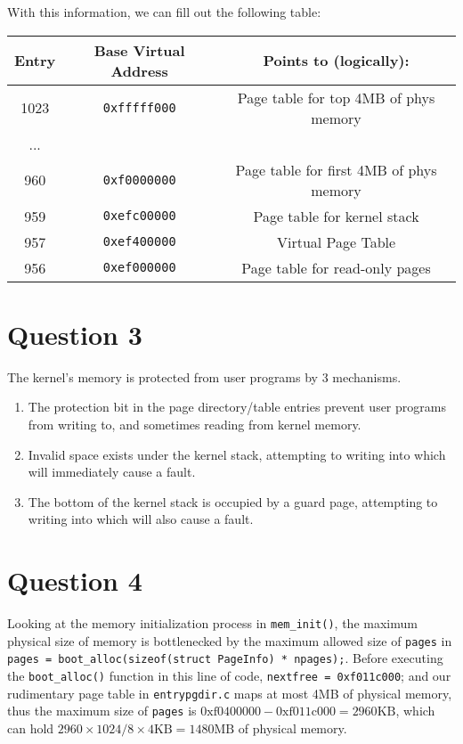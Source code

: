 \documentclass[]{article}
\begin{document}
With this information, we can fill out the  following table:

\begin{center}
	\begin{tabular}{|c|c|c|}
		\hline
		Entry & Base Virtual Address & Points to (logically): \\
		\hline
		1023 & \verb|0xfffff000| & Page table for top 4MB of phys memory\\
		\hline
		... & & \\
		\hline
		960 & \verb|0xf0000000| & Page table for first 4MB of phys memory\\
		\hline
		959 & \verb|0xefc00000| & Page table for kernel stack \\
		\hline
		957 & \verb|0xef400000| & Virtual Page Table\\
		\hline
		956 & \verb|0xef000000| & Page table for read-only pages\\
		\hline
	\end{tabular}
\end{center}

\section*{Question 3}
The kernel's memory is protected from user programs by 3 mechanisms.
\begin{enumerate}
	\item The protection bit in the page directory/table entries prevent user programs from writing to, and sometimes reading from kernel memory.
	\item Invalid space exists under the kernel stack, attempting to writing into which will immediately cause a fault.
	\item The bottom of the kernel stack is occupied by a guard page, attempting to writing into which will also cause a fault.
\end{enumerate}

\section*{Question 4}
Looking at the memory initialization process in \verb|mem_init()|, the maximum physical size of memory is bottlenecked by the maximum allowed size of \verb|pages| in \verb|pages = boot_alloc(sizeof(struct PageInfo) * npages);|. Before executing the \verb|boot_alloc()| function in this line of code, \verb|nextfree = 0xf011c000|; and our rudimentary page table in \verb|entrypgdir.c| maps at most 4MB of physical memory, thus the maximum size of \verb|pages| is $\mathrm{0xf0400000} - \mathrm{0xf011c000} = 2960\text{KB}$, which can hold $2960 \times 1024/8\times4\text{KB} = 1480\text{MB}$ of physical memory.
\end{document}
